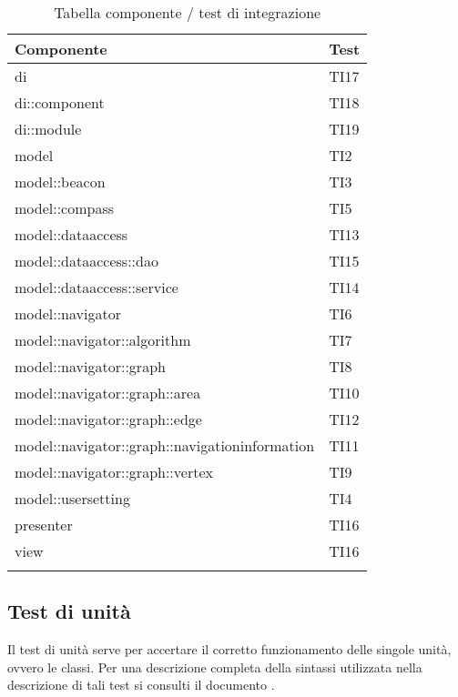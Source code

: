 \documentclass[../PianoDiQualifica.tex]{subfiles}
\begin{document}
\begin{appendices}
\begin{longtabu}to \textwidth{X[3] X[0.5]}
\toprule
\textbf{Componente} & \textbf{Test}\\
\midrule
\endhead
{}
di & TI17 \\ 
\midrule 
di::\-component & TI18 \\ 
\midrule 
di::\-module & TI19 \\ 
\midrule 
model & TI2 \\ 
\midrule 
model::\-beacon & TI3 \\ 
\midrule 
model::\-compass & TI5 \\ 
\midrule 
model::\-dataaccess & TI13 \\ 
\midrule 
model::\-dataaccess::\-dao & TI15 \\ 
\midrule 
model::\-dataaccess::\-service & TI14 \\ 
\midrule 
model::\-navigator & TI6 \\ 
\midrule 
model::\-navigator::\-algorithm & TI7 \\ 
\midrule 
model::\-navigator::\-graph & TI8 \\ 
\midrule 
model::\-navigator::\-graph::\-area & TI10 \\ 
\midrule 
model::\-navigator::\-graph::\-edge & TI12 \\ 
\midrule 
model::\-navigator::\-graph::\-navigationinformation & TI11 \\ 
\midrule 
model::\-navigator::\-graph::\-vertex & TI9 \\ 
\midrule 
model::\-usersetting & TI4 \\ 
\midrule 
presenter & TI16 \\ 
\midrule 
view & TI16 \\ 
\bottomrule
\caption{Tabella componente / test di integrazione} \\
\end{longtabu}

\subsection{Test di unità}
Il test di unità serve per accertare il corretto funzionamento delle singole unità, ovvero le classi. Per una descrizione completa della sintassi utilizzata nella descrizione di tali test si consulti il documento \normediprogettov.
	

\end{appendices}
\end{document}
